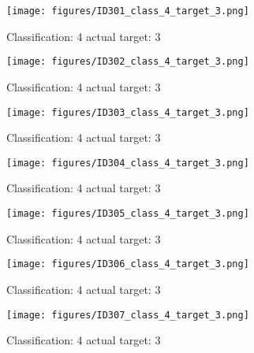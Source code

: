 \begin{figure}[h!]
\begin{center}
\texttt{[image: figures/ID301\_class\_4\_target\_3.png]}
\end{center}
\caption{ Classification: 4 actual target: 3}
\label{fig:ID301_class_4_target_3}
\end{figure}
\begin{figure}[h!]
\begin{center}
\texttt{[image: figures/ID302\_class\_4\_target\_3.png]}
\end{center}
\caption{ Classification: 4 actual target: 3}
\label{fig:ID302_class_4_target_3}
\end{figure}
\begin{figure}[h!]
\begin{center}
\texttt{[image: figures/ID303\_class\_4\_target\_3.png]}
\end{center}
\caption{ Classification: 4 actual target: 3}
\label{fig:ID303_class_4_target_3}
\end{figure}
\begin{figure}[h!]
\begin{center}
\texttt{[image: figures/ID304\_class\_4\_target\_3.png]}
\end{center}
\caption{ Classification: 4 actual target: 3}
\label{fig:ID304_class_4_target_3}
\end{figure}
\begin{figure}[h!]
\begin{center}
\texttt{[image: figures/ID305\_class\_4\_target\_3.png]}
\end{center}
\caption{ Classification: 4 actual target: 3}
\label{fig:ID305_class_4_target_3}
\end{figure}
\begin{figure}[h!]
\begin{center}
\texttt{[image: figures/ID306\_class\_4\_target\_3.png]}
\end{center}
\caption{ Classification: 4 actual target: 3}
\label{fig:ID306_class_4_target_3}
\end{figure}
\begin{figure}[h!]
\begin{center}
\texttt{[image: figures/ID307\_class\_4\_target\_3.png]}
\end{center}
\caption{ Classification: 4 actual target: 3}
\label{fig:ID307_class_4_target_3}
\end{figure}
